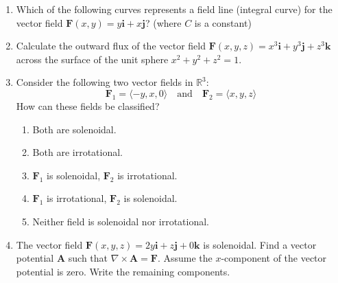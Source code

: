 \documentclass[a4paper, 12pt]{article}
\begin{document}
\begin{enumerate}[leftmargin=*,label=\textbf{\arabic*.}]
\begin{enumerate}[leftmargin=*, label=\textbf{\arabic{enumi}.\arabic*.}]
\item Which of the following curves represents a field line (integral curve) for the vector field $\mathbf{F}(x, y) = y\mathbf{i} + x\mathbf{j}$? (where $C$ is a constant)


\item Calculate the outward flux of the vector field $\mathbf{F}(x, y, z) = x^3\mathbf{i} + y^3\mathbf{j} + z^3\mathbf{k}$ across the surface of the unit sphere $x^2 + y^2 + z^2 = 1$.


\item Consider the following two vector fields in $\mathbb{R}^3$:
\[\mathbf{F}_1 = \langle -y, x, 0 \rangle \quad \text{and} \quad \mathbf{F}_2 = \langle x, y, z \rangle\]
How can these fields be classified?

\begin{enumerate}
    \item[(A)] Both are solenoidal.
    \item[(B)] Both are irrotational.
    \item[(C)] $\mathbf{F}_1$ is solenoidal, $\mathbf{F}_2$ is irrotational.
    \item[(D)] $\mathbf{F}_1$ is irrotational, $\mathbf{F}_2$ is solenoidal.
    \item[(E)] Neither field is solenoidal nor irrotational.
\end{enumerate}

\item The vector field $\mathbf{F}(x, y, z) = 2y\mathbf{i} + z\mathbf{j} + 0\mathbf{k}$ is solenoidal. Find a vector potential $\mathbf{A}$ such that $\nabla \times \mathbf{A} = \mathbf{F}$. Assume the $x$-component of the vector potential is zero. Write the remaining components.

\end{enumerate}
\end{enumerate}
\end{document}
